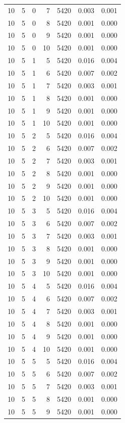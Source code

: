 \begin{table}
\begin{tabular}{rrrrrrr}
10 & 5 & 0 & 7 & 5420 & 0.003 & 0.001 \\
10 & 5 & 0 & 8 & 5420 & 0.001 & 0.000 \\
10 & 5 & 0 & 9 & 5420 & 0.001 & 0.000 \\
10 & 5 & 0 & 10 & 5420 & 0.001 & 0.000 \\
10 & 5 & 1 & 5 & 5420 & 0.016 & 0.004 \\
10 & 5 & 1 & 6 & 5420 & 0.007 & 0.002 \\
10 & 5 & 1 & 7 & 5420 & 0.003 & 0.001 \\
10 & 5 & 1 & 8 & 5420 & 0.001 & 0.000 \\
10 & 5 & 1 & 9 & 5420 & 0.001 & 0.000 \\
10 & 5 & 1 & 10 & 5420 & 0.001 & 0.000 \\
10 & 5 & 2 & 5 & 5420 & 0.016 & 0.004 \\
10 & 5 & 2 & 6 & 5420 & 0.007 & 0.002 \\
10 & 5 & 2 & 7 & 5420 & 0.003 & 0.001 \\
10 & 5 & 2 & 8 & 5420 & 0.001 & 0.000 \\
10 & 5 & 2 & 9 & 5420 & 0.001 & 0.000 \\
10 & 5 & 2 & 10 & 5420 & 0.001 & 0.000 \\
10 & 5 & 3 & 5 & 5420 & 0.016 & 0.004 \\
10 & 5 & 3 & 6 & 5420 & 0.007 & 0.002 \\
10 & 5 & 3 & 7 & 5420 & 0.003 & 0.001 \\
10 & 5 & 3 & 8 & 5420 & 0.001 & 0.000 \\
10 & 5 & 3 & 9 & 5420 & 0.001 & 0.000 \\
10 & 5 & 3 & 10 & 5420 & 0.001 & 0.000 \\
10 & 5 & 4 & 5 & 5420 & 0.016 & 0.004 \\
10 & 5 & 4 & 6 & 5420 & 0.007 & 0.002 \\
10 & 5 & 4 & 7 & 5420 & 0.003 & 0.001 \\
10 & 5 & 4 & 8 & 5420 & 0.001 & 0.000 \\
10 & 5 & 4 & 9 & 5420 & 0.001 & 0.000 \\
10 & 5 & 4 & 10 & 5420 & 0.001 & 0.000 \\
10 & 5 & 5 & 5 & 5420 & 0.016 & 0.004 \\
10 & 5 & 5 & 6 & 5420 & 0.007 & 0.002 \\
10 & 5 & 5 & 7 & 5420 & 0.003 & 0.001 \\
10 & 5 & 5 & 8 & 5420 & 0.001 & 0.000 \\
10 & 5 & 5 & 9 & 5420 & 0.001 & 0.000 \\

\end{tabular}
\end{table}
